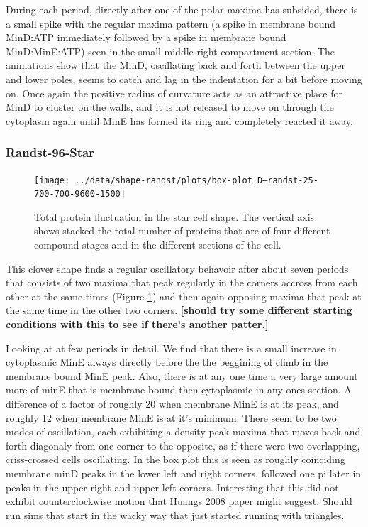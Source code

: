 \documentclass[letterpaper,twocolumn,amsmath,amssymb,pre]{revtex4-1}
\newcommand{\red}[1]{{\bf \color{red} #1}}
\newcommand{\fixme}[1]{\red{[#1]}}
\begin{document}
During each period, directly after one of the polar maxima has
subsided, there is a small spike with the regular maxima pattern (a
spike in membrane bound MinD:ATP immediately followed by a spike in
membrane bound MinD:MinE:ATP) seen in the small middle right
compartment section.  The animations show that the MinD, oscillating
back and forth between the upper and lower poles, seems to catch and
lag in the indentation for a bit before moving on.  Once again the
positive radius of curvature acts as an attractive place for MinD to
cluster on the walls, and it is not released to move on through the
cytoplasm again until MinE has formed its ring and completely reacted
it away.


\subsubsection{Randst-96-Star}
\begin{figure}
  \texttt{[image: ../data/shape-randst/plots/box-plot\_D--randst-25-700-700-9600-1500]}
  \caption{Total protein fluctuation in the star cell shape.  The vertical axis shows stacked the total
    number of proteins that are of four different compound stages and
    in the different sections of the cell.}
  \label{box-96}
\end{figure}

This clover shape finds a regular oscillatory behavoir after about
seven periods that consists of two maxima that peak regularly in the
corners accross from each other at the same times (Figure
\ref{box-96}) and then again opposing maxima that peak at the same
time in the other two corners.\fixme{should try some different
  starting conditions with this to see if there's another patter.}

Looking at at few periods in detail.  We find that there is a small
increase in cytoplasmic MinE always directly before the the beggining
of climb in the membrane bound MinE peak.  Also, there is at any one
time a very large amount more of minE that is membrane bound then
cytoplasmic in any ones section.  A difference of a factor of roughly
20 when membrane MinE is at its peak, and roughly 12 when membrane
MinE is at it's minimum.  There seem to be two modes of oscillation,
each exhibiting a density peak maxima that moves back and forth
diagonaly from one corner to the opposite, as if there were two
overlapping, criss-crossed cells oscillating.  In the box plot this is
seen as roughly coinciding membrane minD peaks in the lower left and
right corners, followed one pi later in peaks in the upper right and
upper left corners.  Interesting that this did not exhibit
counterclockwise motion that Huangs 2008 paper might suggest.  Should
run sims that start in the wacky way that just started running with
triangles.
\newline
\end{document}
